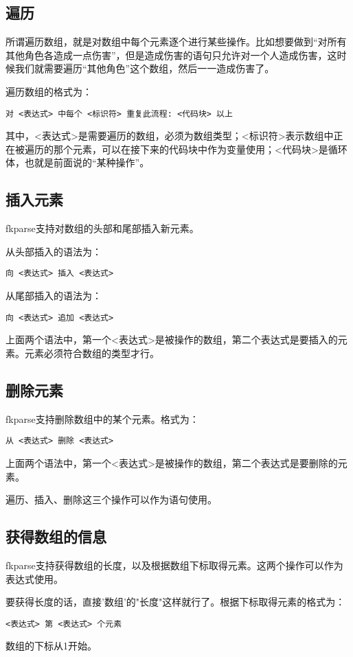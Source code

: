 \subsection{遍历}

所谓遍历数组，就是对数组中每个元素逐个进行某些操作。比如想要做到“对所有其他角色各造成一点伤害”，但是造成伤害的语句只允许对一个人造成伤害，这时候我们就需要遍历“其他角色”这个数组，然后一一造成伤害了。

遍历数组的格式为：

\begin{verbatim}
对 <表达式> 中每个 <标识符> 重复此流程: <代码块> 以上
\end{verbatim}

其中，<表达式>是需要遍历的数组，必须为数组类型；<标识符>表示数组中正在被遍历的那个元素，可以在接下来的代码块中作为变量使用；<代码块>是循环体，也就是前面说的“某种操作”。

\subsection{插入元素}

fkparse支持对数组的头部和尾部插入新元素。

从头部插入的语法为：

\begin{verbatim}
向 <表达式> 插入 <表达式>
\end{verbatim}

从尾部插入的语法为：

\begin{verbatim}
向 <表达式> 追加 <表达式>
\end{verbatim}

上面两个语法中，第一个<表达式>是被操作的数组，第二个表达式是要插入的元素。元素必须符合数组的类型才行。

\subsection{删除元素}

fkparse支持删除数组中的某个元素。格式为：

\begin{verbatim}
从 <表达式> 删除 <表达式>
\end{verbatim}

上面两个语法中，第一个<表达式>是被操作的数组，第二个表达式是要删除的元素。

遍历、插入、删除这三个操作可以作为语句使用。

\subsection{获得数组的信息}

fkparse支持获得数组的长度，以及根据数组下标取得元素。这两个操作可以作为表达式使用。

要获得长度的话，直接'数组'的"长度"这样就行了。根据下标取得元素的格式为：

\begin{verbatim}
<表达式> 第 <表达式> 个元素
\end{verbatim}

数组的下标从1开始。

